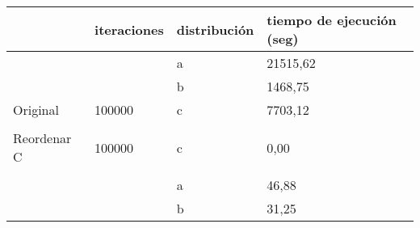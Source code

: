 \documentclass{article}
\begin{document}
	
	\begin{table}[h]
		\begin{tabular}{llll}
			\hline
			\rowcolor[HTML]{F8A102} 
			\multicolumn{1}{|l|}{\cellcolor[HTML]{F8A102}modificación} & \multicolumn{1}{l|}{\cellcolor[HTML]{F8A102}iteraciones} & \multicolumn{1}{l|}{\cellcolor[HTML]{F8A102}distribución} & \multicolumn{1}{l|}{\cellcolor[HTML]{F8A102}tiempo de ejecución (seg)} \\ \hline
			\multicolumn{1}{|l|}{}                                     & \multicolumn{1}{l|}{}                                    & \multicolumn{1}{l|}{a}                                    & \multicolumn{1}{l|}{21515,62}                                    \\ \cline{3-4} 
			\multicolumn{1}{|l|}{}                                     & \multicolumn{1}{l|}{}                                    & \multicolumn{1}{l|}{b}                                    & \multicolumn{1}{l|}{1468,75}                                     \\ \cline{3-4} 
			\multicolumn{1}{|l|}{\multirow{-3}{*}{Original}}           & \multicolumn{1}{l|}{\multirow{-3}{*}{100000}}            & \multicolumn{1}{l|}{c}                                    & \multicolumn{1}{l|}{7703,12}                                     \\ \hline
			&                                                          &                                                           &                                                                  \\ \hline
			\multicolumn{1}{|l|}{Reordenar C}                          & \multicolumn{1}{l|}{100000}                              & \multicolumn{1}{l|}{c}                                    & \multicolumn{1}{l|}{0,00}                                        \\ \hline
			&                                                          &                                                           &                                                                  \\ \hline
			\multicolumn{1}{|l|}{}                                     & \multicolumn{1}{l|}{}                                    & \multicolumn{1}{l|}{a}                                    & \multicolumn{1}{l|}{46,88}                                       \\ \cline{3-4} 
			\multicolumn{1}{|l|}{}                                     & \multicolumn{1}{l|}{}                                    & \multicolumn{1}{l|}{b}                                    & \multicolumn{1}{l|}{31,25}                                       \\ \cline{3-4} 

\end{tabular}
\end{table}
\end{document}
